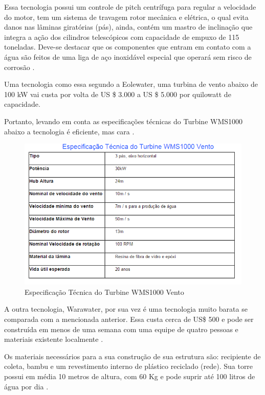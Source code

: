 Essa tecnologia possui um controle de pitch centrífuga para regular a velocidade do motor, tem um sistema de travagem
rotor mecânica e elétrica, o qual evita danos nas lâminas giratórias (pás), ainda, contém um mastro de inclinação que 
integra a ação dos cilindros telescópicos com capacidade de empuxo de 115 toneladas. Deve-se destacar que os componentes 
que entram em contato com a água são feitos de uma liga de aço inoxidável especial que operará sem risco de corrosão 
\cite{eole}.

Uma tecnologia como essa segundo a Eolewater, uma turbina de vento abaixo de 100 kW vai custa por volta de US \$ 3.000 a US \$ 5.000 por quilowatt de capacidade\cite{eole}.

Portanto, levando em conta as especificações técnicas do Turbine WMS1000 abaixo a tecnologia é eficiente, mas cara \cite{renewable}.
	
\begin{figure}[!htbp]
\centering
\includegraphics[scale=0.8]{editaveis/figuras/especificacao}
\caption[Especificação Técnica do Turbine WMS1000]{Especificação Técnica do Turbine WMS1000 Vento \footnotemark}
\FloatBarrier
\label{Especificacoes}
\end{figure}
 
A outra tecnologia, Warawater, por sua vez é uma tecnologia muito barata se comparada com a mencionada anterior. 
Essa custa cerca de US\$ 500 e pode ser construída em menos de uma semana com uma equipe de quatro pessoas e materiais 
existente localmente \cite{warkawater}.

Os materiais necessários para a sua construção de sua estrutura são: recipiente de coleta, bambu e um revestimento
interno de plástico reciclado (rede). Sua torre possui em média 10 metros de altura, com 60 Kg e pode suprir até 100 litros
de água por dia \cite{warkawater2}.

